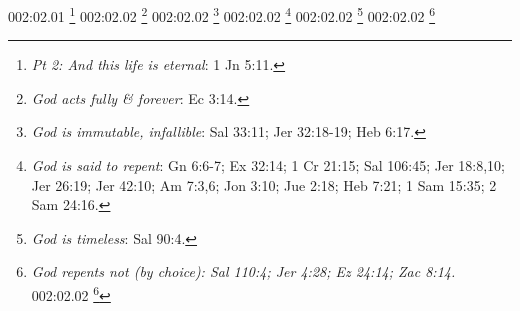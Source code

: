 {{{{{{{{{002:02.01 \footnote{\textit{Pt 2: And this life is eternal}: 1 Jn 5:11.}
002:02.02 \footnote{\textit{God acts fully & forever}: Ec 3:14.}
002:02.02 \footnote{\textit{God is immutable, infallible}: Sal 33:11; Jer 32:18-19; Heb 6:17.}
002:02.02 \footnote{\textit{God is said to repent}: Gn 6:6-7; Ex 32:14; 1 Cr 21:15; Sal 106:45; Jer 18:8,10; Jer 26:19; Jer 42:10; Am 7:3,6; Jon 3:10; Jue 2:18; Heb 7:21; 1 Sam 15:35; 2 Sam 24:16.}
002:02.02 \footnote{\textit{God is timeless}: Sal 90:4.}
002:02.02 \footnote{\textit{God repents not (by choice): Sal 110:4; Jer 4:28; Ez 24:14; Zac 8:14.}
002:02.02 \footnote{\textit{God repents not (by nature): Nm 23:19; 1 Sam 15:29.}
002:03.01 \footnote{\textit{God is no respecter of persons}: 2 Cr 19:7; Job 34:19; Eclo 35:12; Hch 10:34; Ro 2:11; Gl 2:6; Gl 3:28; Ef 6:9; Col 3:11.}
002:03.01 \footnote{\textit{God is righteous in all ways}: Sal 145:17.}
002:03.01 \footnote{\textit{God not acted without cause}: Ez 14:23.}
002:03.01 \footnote{\textit{Judgments are true, righteous}: Sal 19:9.}
002:03.01 \footnote{\textit{No iniquity in the Lord}: 2 Cr 19:7.}
002:03.02 \footnote{\textit{One reaps what one sows}: Job 4:8; Gl 6:7.}
002:03.04 \footnote{\textit{Extinction as punishment}: Abd 1:16.}
002:04.01 \footnote{\textit{Does not afflict willingly}: Lm 3:33.}
002:04.01 \footnote{\textit{Father of mercies}: 2 Co 1:3.}
002:04.01 \footnote{\textit{God of compassion, mercy}: Sal 145:8; Sal 86:15.}
002:04.01 \footnote{\textit{He will abundantly pardon}: Is 55:7.}
002:04.01 \footnote{\textit{His mercy endures forever}: 1 Cr 16:34,41; 2 Cr 5:13; 2 Cr 7:3,6; Sal 107:1; Sal 118:1-4; Sal 136:1-26.}
002:04.01 \footnote{\textit{His mercy is everlasting}: Sal 100:5; Sal 103:17; Is 54:8.}
002:04.01 \footnote{\textit{Lord executes loving-kindness}: Jer 9:24.}
002:04.01 \footnote{\textit{Who calls on Lord is saved}: Sal 50:15; Jl 2:32; Zac 13:9; Hch 2:21; Ro 10:13.}
002:05.01 \footnote{\textit{God is Love}: 1 Jn 4:8,16.}
002:05.01 \footnote{\textit{Sun rises on evil and good}: Mt 5:45.}
002:05.02 \footnote{\textit{Not willing any should perish}: 2 P 3:9.}
002:05.02 \footnote{\textit{The Father loves you}: Jn 16:27.}
002:05.02 \footnote{\textit{Whosoever will may come}: Sal 50:15; Jl 2:32; Zac 13:9; Mt 7:24; Mt 10:32-33; Mt 12:50; Mt 16:24-25; Mc 3:35; Mc 8:34-35; Lc 6:47; Lc 9:23-24; Lc 12:8; Jn 3:15-16; Jn 4:13-14; Jn 11:25-26; Jn 12:46; Hch 2:21; Hch 10:42-43; Hch 13:26; Ro 9:33; Ro 10:13; 1 Jn 2:23; 1 Jn 4:15; 1 Jn 5:1; Ap 22:17b.}
002:05.02 \footnote{\textit{Would all men be saved}: 1 Ti 2:4.}
002:05.03 \footnote{\textit{Chasten us for own profit}: Heb 12:10.}
}}}}}}}}}}}
